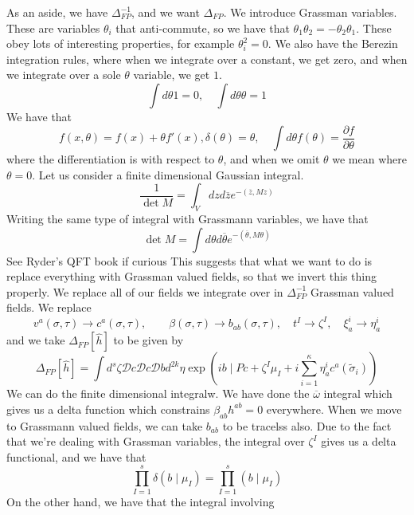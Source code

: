 \documentclass[11pt, oneside]{article}   	%
\theoremstyle{slanted}
\begin{document}
As an aside, we have $ \Delta ^{ - 1 }_{ FP } $, and we 
want $ \Delta _{ FP } $. 
We introduce Grassman variables. These are variables 
$ \theta _ i $ that anti-commute, 
so we have that $ \theta _ 1 \theta _ 2 =  - \theta _ 2 \theta _ 1 $. 
These obey lots of interesting properties, 
for example $ \theta _ i ^ 2  = 0 $. We 
also have the Berezin integration rules, where 
when we integrate over a constant, we get zero, 
and when we integrate over a sole $ \theta $ variable, we get $ 1 $. 
\[
\int d \theta 1  = 0, \quad \int d \theta \theta = 1 
\] 
We have that 
\[
f \left( x, \theta  \right)   = f\left( x  \right) + \theta f ' \left( x  \right) , 
\delta \left( \theta  \right)   = \theta , \quad 
\int d \theta f \left( \theta  \right)   = \frac{\partial  f }{\partial  \theta } 
\] where the differentiation is 
with respect to $ \theta $, and when 
we omit $ \theta $ we mean where $ \theta = 0 $. Let us consider a finite 
dimensional Gaussian integral. 
\[
\frac{1}{\det M }  = \int _ V dz d \overline{ z  } e ^{  - \left( \overline{ z }, 
M z  \right) }
\] Writing the same type of integral with Grassmann variables, 
we have that 
\[
\det M  = \int d \theta d \overline{ \theta } e ^{  - \left( 
\overline{ \theta } , M \theta \right) }
\] See Ryder's QFT book if curious 
This suggests that what we want to do 
is replace everything with Grassman valued fields, 
so that we invert this thing properly. 
We replace all of our fields we integrate over 
in $ \Delta ^{ - 1 } _{ FP } $ Grassman valued 
fields. 
We replace \[
v ^ a \left( \sigma, \tau  \right)  \to c ^ a \left( \sigma, \tau  \right), \quad  
\quad \beta \left( \sigma, \tau  \right)  \to b _{ab } \left( \sigma, \tau  \right) ,\quad 
t ^ I \to \zeta ^ I , \quad \xi ^ i _ a \to \eta ^ i _ a 
\] and we take $ \Delta _{ FP } \left[  \hat{ h }  \right]  $ 
to be given by 
\[
\Delta _{ FP } \left[ \hat{ h }   \right]  
 = \int d ^ s \zeta 
 \mathcal{ D }c \mathcal{ D}c \mathcal{ D } b d ^{ 2k } \eta 
 \exp \left(  i b \mid P c + \zeta ^ I \mu _ I + 
 i \sum _{ i = 1 } ^ \kappa \eta ^ i _ a  c ^ a \left( 
\tilde{ \sigma  } _ i  \right) \right)  
\] We can do the finite dimensional integralw. 
We have done the $ \overline{ \omega } $ integral which gives us 
a delta function which 
constrains $ \beta _{ ab } h ^{ ab }  = 0 $ everywhere. 
When we move to Grassmann valued fields, 
we can take $ b _{ ab } $ to be tracelss also. 
Due to the fact that we're
dealing with Grassman variables, the integral over 
$ \zeta ^ I $ gives us a delta functional, and we have that 
\[
\prod_{ I  = 1 }^ s \delta\left( b\mid \mu _ I  \right)  
= \prod_{ I  = 1 } ^ s \left( b \mid \mu _ I  \right) 
\] On the other hand, we have that the integral involving 
\end{document}
